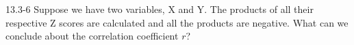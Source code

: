 \begin{exsol@exercise}{13.3-6}
Suppose we have two variables, X and Y. The products of all their respective Z scores are calculated and all the products are negative. What can we conclude about the correlation coefficient $r$?
\end{exsol@exercise}
